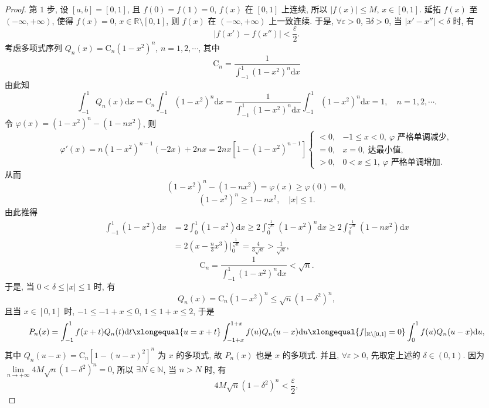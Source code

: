 \begin{proof}
第 $1$ 步, 设 $[a,b]=[0,1]$, 且 $f(0)=f(1)=0$, $f(x)$ 在 $[0,1]$ 上连续, 所以 $|f(x)|\leqslant M$, $x\in[0,1]$. 延拓 $f(x)$ 至 $(-\infty,+\infty)$, 使得 $f(x)=0$, $x\in\mathbb{R}\setminus[0,1]$, 则 $f(x)$ 在 $(-\infty,+\infty)$ 上一致连续. 于是, $\forall\varepsilon>0$, $\exists\delta>0$, 当 $|x'-x''|<\delta$ 时, 有
\[
  |f(x')-f(x'')|<\frac{\varepsilon}{2}.
\]
考虑多项式序列 $Q_{n}(x)=\mathrm{C}_{n}(1-x^{2})^{n}$, $n=1,2,\cdots$, 其中
\[
  \mathrm{C}_{n}=\frac{1}{\displaystyle\int_{-1}^{1}(1-x^{2})^{n}\mathrm{d}x}
\]
由此知
\[
  \int_{-1}^{1}Q_{n}(x)\mathrm{d}x=\mathrm{C}_{n}\int_{-1}^{1}(1-x^{2})^{n}\mathrm{d}x=\frac{1}{\int_{-1}^{1}(1-x^{2})^{n}\mathrm{d}x}\int_{-1}^{1}(1-x^{2})^{n}\mathrm{d}x=1,\quad n=1,2,\cdots.
\]
令 $\varphi(x)=(1-x^{2})^{n}-(1-nx^{2})$, 则
\[
  \varphi'(x)=n(1-x^{2})^{n-1}(-2x)+2nx=2nx\left[1-(1-x^{2})^{n-1}\right]\begin{cases}
    <0, & -1\leqslant x<0,\ \varphi\text{ 严格单调减少},\\
    =0, & x=0,\ \text{达最小值},\\
    >0, & 0<x\leqslant1,\ \varphi\text{ 严格单调增加}.
\end{cases}
\]
从而
\[
  (1-x^{2})^{n}-(1-nx^{2})=\varphi(x)\geqslant\varphi(0)=0,
\]
\[
  (1-x^{2})^{n}\geqslant1-nx^{2},\quad|x|\leqslant1.
\]
由此推得
\[
  \begin{aligned}
    \int_{-1}^{1}(1-x^{2})\mathrm{d}x&=2\int_{0}^{1}(1-x^{2})\mathrm{d}x\geqslant2\int_{0}^{\frac{1}{\sqrt{n}}}(1-x^{2})^{n}\mathrm{d}x\geqslant2\int_{0}^{\frac{1}{\sqrt{n}}}(1-nx^{2})\mathrm{d}x\\
    &=2\left(x-\frac{n}{3}x^{3}\right)\bigg|_{0}^{\frac{1}{\sqrt{n}}}=\frac{4}{3\sqrt{n}}>\frac{1}{\sqrt{n}},
  \end{aligned}
\]
\[
  \mathrm{C}_{n}=\frac{1}{\displaystyle\int_{-1}^{1}(1-x^{2})^{n}\mathrm{d}x}<\sqrt{n}.
\]
于是, 当 $0<\delta\leqslant|x|\leqslant1$ 时, 有
\[
  Q_{n}(x)=\mathrm{C}_{n}(1-x^{2})^{n}\leqslant\sqrt{n}(1-\delta^{2})^{n},
\]
且当 $x\in[0,1]$ 时, $-1\leqslant-1+x\leqslant0$, $1\leqslant1+x\leqslant2$, 于是
\[
  P_{n}(x)=\int_{-1}^{1}f(x+t)Q_{n}(t)\mathrm{d}t\xlongequal{u=x+t}\int_{-1+x}^{1+x}f(u)Q_{n}(u-x)\mathrm{d}u\xlongequal{f|_{\mathbb{R}\setminus[0,1]}=0}\int_{0}^{1}f(u)Q_{n}(u-x)\mathrm{d}u,
\]
其中 $Q_{n}(u-x)=\mathrm{C}_{n}[1-(u-x)^{2}]^{n}$ 为 $x$ 的多项式, 故 $P_{n}(x)$ 也是 $x$ 的多项式. 并且, $\forall\varepsilon>0$, 先取定上述的 $\delta\in(0,1)$. 因为 $\lim\limits_{n\to+\infty}4M\sqrt{n}(1-\delta^{2})^{n}=0$, 所以 $\exists N\in\mathbb{N}$, 当 $n>N$ 时, 有
\[
  4M\sqrt{n}(1-\delta^{2})^{n}<\frac{\varepsilon}{2},
\]
\end{proof}
